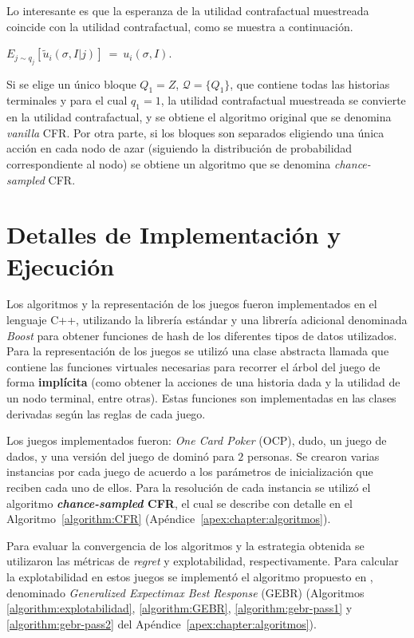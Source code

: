 Lo interesante es que la esperanza de la utilidad contrafactual muestreada coincide con la utilidad contrafactual, como se muestra a continuación.

\begin{theorem}
\label{theo:esperanza-MCCFR}
$E_{j \sim q_j} [\tilde{u}_i(\sigma, I | j)]\ =\ u_i(\sigma, I)$.
\end{theorem}

Si se elige un único bloque $Q_1=Z$, $\mathcal{Q} = \{Q_1\}$, que contiene todas las historias terminales y para el cual $q_1=1$, la utilidad contrafactual muestreada se convierte en la utilidad contrafactual, y se obtiene el algoritmo original que se denomina \textit{vanilla} CFR. Por otra parte, si los bloques son separados eligiendo una única acción en cada nodo de azar (siguiendo la distribución de probabilidad correspondiente al nodo) se obtiene un algoritmo que se denomina \textit{chance-sampled} CFR.

\section{Detalles de Implementación y Ejecución}

Los algoritmos y la representación de los juegos fueron implementados en el lenguaje C++, utilizando la librería estándar y una librería adicional denominada \textit{Boost} \cite{bib:boost} para obtener funciones de hash de los diferentes tipos de datos utilizados. Para la representación de los juegos se utilizó una clase abstracta llamada  que contiene las funciones virtuales necesarias para recorrer el árbol del juego de forma \textbf{implícita} (como obtener la acciones de una historia dada y la utilidad de un nodo terminal, entre otras). Estas funciones son implementadas en las clases derivadas según las reglas de cada juego.

Los juegos implementados fueron: \textit{One Card Poker} (OCP), dudo, un juego de dados, y una versión del juego de dominó para $2$ personas. Se crearon varias instancias por cada juego de acuerdo a los parámetros de inicialización que reciben cada uno de ellos. Para la resolución de cada instancia se utilizó el algoritmo \textbf{\textit{chance-sampled} CFR}, el cual se describe con detalle en el Algoritmo~\ref{algorithm:CFR} (Apéndice~\ref{apex:chapter:algoritmos}).

Para evaluar la convergencia de los algoritmos y la estrategia obtenida se utilizaron las métricas de \textit{regret} y explotabilidad, respectivamente. Para calcular la explotabilidad en estos juegos se implementó el algoritmo propuesto en \cite{bib:thesis-marc-lanctot}, denominado \textit{Generalized Expectimax Best Response} (GEBR) (Algoritmos \ref{algorithm:explotabilidad}, \ref{algorithm:GEBR}, \ref{algorithm:gebr-pass1} y \ref{algorithm:gebr-pass2} del Apéndice~\ref{apex:chapter:algoritmos}).

